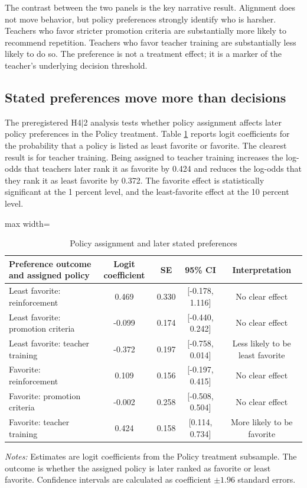 \documentclass[12pt,a4paper]{article}
\newcommand{\ci}[2]{[#1, #2]}
\newcommand{\tabnote}[1]{\vspace{0.3em}\parbox{0.94\textwidth}{\footnotesize \textit{Notes:} #1}}
\begin{document}
The contrast between the two panels is the key narrative result. Alignment does not move behavior, but policy preferences strongly identify who is harsher. Teachers who favor stricter promotion criteria are substantially more likely to recommend repetition. Teachers who favor teacher training are substantially less likely to do so. The preference is not a treatment effect; it is a marker of the teacher's underlying decision threshold.

\subsection{Stated preferences move more than decisions}

The preregistered H4\(|\)2 analysis tests whether policy assignment affects later policy preferences in the Policy treatment. Table \ref{tab:h42} reports logit coefficients for the probability that a policy is listed as least favorite or favorite. The clearest result is for teacher training. Being assigned to teacher training increases the log-odds that teachers later rank it as favorite by 0.424 and reduces the log-odds that they rank it as least favorite by 0.372. The favorite effect is statistically significant at the 1 percent level, and the least-favorite effect at the 10 percent level.

\begin{table}[!htbp]
\centering
\caption{Policy assignment and later stated preferences}
\label{tab:h42}
\begin{threeparttable}
\begin{adjustbox}{max width=\textwidth}
\begin{tabular}{lcccc}
\toprule
Preference outcome and assigned policy & Logit coefficient & SE & 95\% CI & Interpretation \\
\midrule
Least favorite: reinforcement & 0.469 & 0.330 & \ci{-0.178}{1.116} & No clear effect \\
Least favorite: promotion criteria & -0.099 & 0.174 & \ci{-0.440}{0.242} & No clear effect \\
Least favorite: teacher training & -0.372 & 0.197 & \ci{-0.758}{0.014} & Less likely to be least favorite \\
\midrule
Favorite: reinforcement & 0.109 & 0.156 & \ci{-0.197}{0.415} & No clear effect \\
Favorite: promotion criteria & -0.002 & 0.258 & \ci{-0.508}{0.504} & No clear effect \\
Favorite: teacher training & 0.424 & 0.158 & \ci{0.114}{0.734} & More likely to be favorite \\
\bottomrule
\end{tabular}
\end{adjustbox}
\tabnote{Estimates are logit coefficients from the Policy treatment subsample. The outcome is whether the assigned policy is later ranked as favorite or least favorite. Confidence intervals are calculated as coefficient \(\pm 1.96\) standard errors.}
\end{threeparttable}
\end{table}
\end{document}
